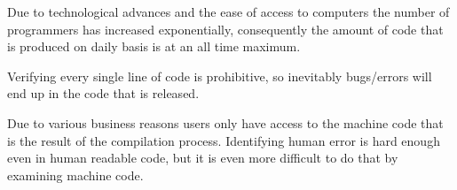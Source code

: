 Due to technological advances and the ease of access to computers the number
of programmers has increased exponentially, consequently the amount of code
that is produced on daily basis is at an all time maximum.

Verifying every single line of code is prohibitive, so inevitably bugs/errors
will end up in the code that is released.

Due to various business reasons users only have access to the machine code that
is the result of the compilation process. Identifying human error is hard
enough even in human readable code, but it is even more difficult to do that
by examining machine code.


